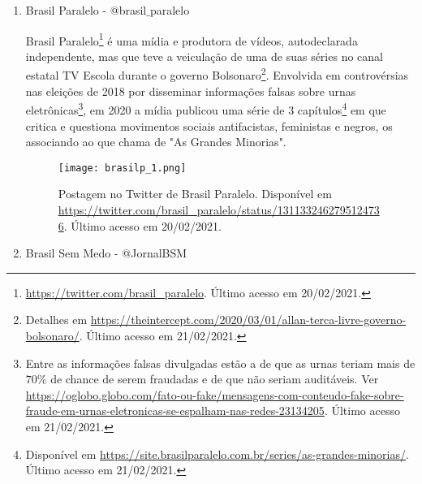 \documentclass[
	12pt,				%
	openright,			%
	twoside,			%
	a4paper,			%
	english,			%
	brazil				%
	]{abntex2}
\begin{document}
\begin{anexosenv}
\begin{enumerate}
 A Aliança pelo Brasil\footnote{\url{https://twitter.com/somosalianca}. Último acesso em 20/02/2021.} é uma organização política que pretende se desenvolver em partido político. Foi anunciada por Jair Bolsonaro em 2019, uma vez declarada sua saída do Partido Social Liberal (PSL). Em seu programa publicado, a organização se opõe à descriminalização do aborto e se propõe a combater a ``ideologia de gênero''.
 
 \begin{figure}[!htbp]
    \centering
    \texttt{[image: alianca\_1.png]}
    \caption{Postagem no Facebook da Aliança pelo Brasil da Bahia. Disponível em \url{https://m.facebook.com/story.php?story_fbid=209026130562994&id=103489347783340}. Último acesso em 20/02/2021.}
    \label{fig:alianca}
 \end{figure}
 
  \item Brasil Paralelo - @brasil$\_$paralelo
  
  Brasil Paralelo\footnote{\url{https://twitter.com/brasil_paralelo}. Último acesso em 20/02/2021.} é uma mídia e produtora de vídeos, autodeclarada independente, mas que teve a veiculação de uma de suas séries no canal estatal TV Escola durante o governo Bolsonaro\footnote{Detalhes em \url{https://theintercept.com/2020/03/01/allan-terca-livre-governo-bolsonaro/}. Último acesso em 21/02/2021.}. Envolvida em controvérsias nas eleições de 2018 por disseminar informações falsas sobre urnas eletrônicas\footnote{Entre as informações falsas divulgadas estão a de que as urnas teriam mais de $70\%$ de chance de serem fraudadas e de que não seriam auditáveis. Ver \url{https://oglobo.globo.com/fato-ou-fake/mensagens-com-conteudo-fake-sobre-fraude-em-urnas-eletronicas-se-espalham-nas-redes-23134205}. Último acesso em 21/02/2021.}, em 2020 a mídia publicou uma série de 3 capítulos\footnote{Disponível em \url{https://site.brasilparalelo.com.br/series/as-grandes-minorias/}. Último acesso em 21/02/2021.} em que critica e questiona movimentos sociais antifacistas, feministas e negros, os associando ao que chama de "As Grandes Minorias".
 
 \begin{figure}[!htbp]
    \centering
    \texttt{[image: brasilp\_1.png]}
    \caption{Postagem no Twitter de Brasil Paralelo. Disponível em \url{https://twitter.com/brasil_paralelo/status/1311332462795124736}. Último acesso em 20/02/2021.}
 \end{figure}

  \item Brasil Sem Medo - @JornalBSM\label{bsm}
  

\end{enumerate}
\end{anexosenv}
\end{document}

